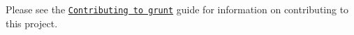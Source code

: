Please see the \href{http://gruntjs.com/contributing}{\tt Contributing to grunt} guide for information on contributing to this project. 
